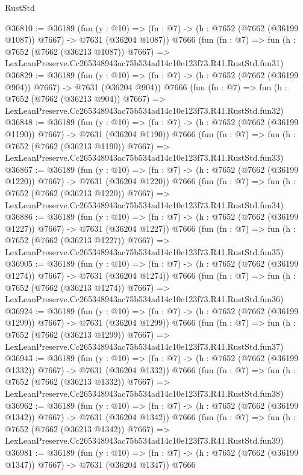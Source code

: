 \begin{lexlean}{RustStd}
\begin{coremodule}
@36810 := @36189
    (fun (y : @10) => (fn : @7) -> (h : @7652 (@7662 (@36199 @1087)) @7667) -> @7631 (@36204 @1087))
    @7666
    (fun (fn : @7) =>
    fun (h : @7652 (@7662 (@36213 @1087)) @7667) =>
    LexLeanPreserve.Cc265348943ac75b534ad14c10e123f73.R41.RustStd.fun31)
@36829 := @36189
    (fun (y : @10) => (fn : @7) -> (h : @7652 (@7662 (@36199 @904)) @7667) -> @7631 (@36204 @904))
    @7666
    (fun (fn : @7) =>
    fun (h : @7652 (@7662 (@36213 @904)) @7667) =>
    LexLeanPreserve.Cc265348943ac75b534ad14c10e123f73.R41.RustStd.fun32)
@36848 := @36189
    (fun (y : @10) => (fn : @7) -> (h : @7652 (@7662 (@36199 @1190)) @7667) -> @7631 (@36204 @1190))
    @7666
    (fun (fn : @7) =>
    fun (h : @7652 (@7662 (@36213 @1190)) @7667) =>
    LexLeanPreserve.Cc265348943ac75b534ad14c10e123f73.R41.RustStd.fun33)
@36867 := @36189
    (fun (y : @10) => (fn : @7) -> (h : @7652 (@7662 (@36199 @1220)) @7667) -> @7631 (@36204 @1220))
    @7666
    (fun (fn : @7) =>
    fun (h : @7652 (@7662 (@36213 @1220)) @7667) =>
    LexLeanPreserve.Cc265348943ac75b534ad14c10e123f73.R41.RustStd.fun34)
@36886 := @36189
    (fun (y : @10) => (fn : @7) -> (h : @7652 (@7662 (@36199 @1227)) @7667) -> @7631 (@36204 @1227))
    @7666
    (fun (fn : @7) =>
    fun (h : @7652 (@7662 (@36213 @1227)) @7667) =>
    LexLeanPreserve.Cc265348943ac75b534ad14c10e123f73.R41.RustStd.fun35)
@36905 := @36189
    (fun (y : @10) => (fn : @7) -> (h : @7652 (@7662 (@36199 @1274)) @7667) -> @7631 (@36204 @1274))
    @7666
    (fun (fn : @7) =>
    fun (h : @7652 (@7662 (@36213 @1274)) @7667) =>
    LexLeanPreserve.Cc265348943ac75b534ad14c10e123f73.R41.RustStd.fun36)
@36924 := @36189
    (fun (y : @10) => (fn : @7) -> (h : @7652 (@7662 (@36199 @1299)) @7667) -> @7631 (@36204 @1299))
    @7666
    (fun (fn : @7) =>
    fun (h : @7652 (@7662 (@36213 @1299)) @7667) =>
    LexLeanPreserve.Cc265348943ac75b534ad14c10e123f73.R41.RustStd.fun37)
@36943 := @36189
    (fun (y : @10) => (fn : @7) -> (h : @7652 (@7662 (@36199 @1332)) @7667) -> @7631 (@36204 @1332))
    @7666
    (fun (fn : @7) =>
    fun (h : @7652 (@7662 (@36213 @1332)) @7667) =>
    LexLeanPreserve.Cc265348943ac75b534ad14c10e123f73.R41.RustStd.fun38)
@36962 := @36189
    (fun (y : @10) => (fn : @7) -> (h : @7652 (@7662 (@36199 @1342)) @7667) -> @7631 (@36204 @1342))
    @7666
    (fun (fn : @7) =>
    fun (h : @7652 (@7662 (@36213 @1342)) @7667) =>
    LexLeanPreserve.Cc265348943ac75b534ad14c10e123f73.R41.RustStd.fun39)
@36981 := @36189
    (fun (y : @10) => (fn : @7) -> (h : @7652 (@7662 (@36199 @1347)) @7667) -> @7631 (@36204 @1347))
    @7666

\end{coremodule}
\end{lexlean}
